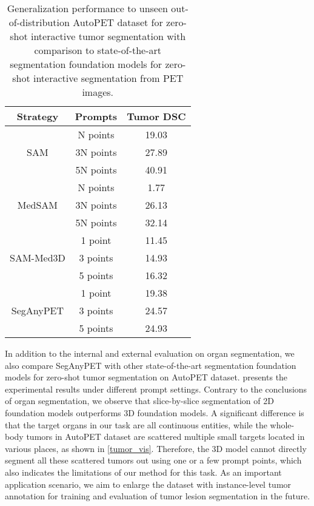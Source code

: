 \begin{table}[h]
    \centering
    \normalsize
    \setlength\tabcolsep{9pt}
	\renewcommand\arraystretch{1.08}
	\begin{tabular}{c|c|c}
		\hline 	\hline
		Strategy  & Prompts & Tumor DSC \\ \hline
\multirow{3}{*}{SAM \cite{SAM}}  & N points & 19.03 \\
& 3N points & 27.89 \\
& 5N points & 40.91 \\ \hline 
\multirow{3}{*}{MedSAM \cite{MedSAM}} & N points & 1.77 \\
& 3N points & 26.13 \\
& 5N points & 32.14 \\ \hline 
\multirow{3}{*}{SAM-Med3D \cite{SAM-Med3D}} & 1 point & 11.45   \\ 
& 3 points & 14.93 \\
& 5 points & 16.32 \\  \hline 
\multirow{3}{*}{SegAnyPET} & 1 point & 19.38   \\ 
& 3 points & 24.57 \\
& 5 points & 24.93 \\  \hline \hline
	\end{tabular}
	\caption{Generalization performance to unseen out-of-distribution AutoPET dataset for zero-shot interactive tumor segmentation with comparison to state-of-the-art segmentation foundation models for zero-shot interactive segmentation from PET images.} \label{Table_Tumor}
\end{table}


In addition to the internal and external evaluation on organ segmentation, we also compare SegAnyPET with other state-of-the-art segmentation foundation models for zero-shot tumor segmentation on AutoPET dataset.
 presents the experimental results under different prompt settings. Contrary to the conclusions of organ segmentation, we observe that slice-by-slice segmentation of 2D foundation models outperforms 3D foundation models.
A significant difference is that the target organs in our task are all continuous entities, while the whole-body tumors in AutoPET dataset are scattered multiple small targets located in various places, as shown in \cref{tumor_vis}. Therefore, the 3D model cannot directly segment all these scattered tumors out using one or a few prompt points, which also indicates the limitations of our method for this task.
As an important application scenario, we aim to enlarge the dataset with instance-level tumor annotation for training and evaluation of tumor lesion segmentation in the future.

